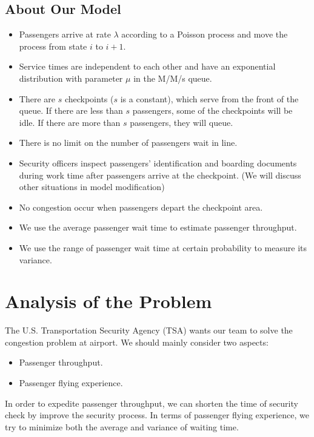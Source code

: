 \documentclass{mcmthesis}
\begin{document}
\subsection{About Our Model}
\begin{itemize}
	\item Passengers arrive at rate $\lambda$ according to a Poisson process and move the process from state $i$ to $i+1$.
	\item Service times are independent to each other and have an exponential distribution with parameter $\mu$ in the M/M/s queue.
	\item There are $s$ checkpoints ($s$ is a constant), which serve from the front of the queue. If there are less than $s$ passengers, some of the checkpoints will be idle. If there are more than $s$ passengers, they will queue.
	\item There is no limit on the number of passengers wait in line.
	\item Security officers inspect passengers' identification and boarding documents during work time after passengers arrive at the checkpoint. (We will discuss other situations in model modification)
	\item No congestion occur when passengers depart the checkpoint area. 
	\item We use the average passenger wait time to estimate passenger throughput. 
	\item We use the range of passenger wait time at certain probability to measure its variance.
\end{itemize}


\section{Analysis of the Problem}

\par The U.S. Transportation Security Agency (TSA) wants our team to solve the congestion problem at airport. We should mainly consider two aspects: 
\begin{itemize}
	\item Passenger throughput.
	\item Passenger flying experience.
\end{itemize}
\par In order to expedite passenger throughput, we can shorten the time of security check by improve the security process. In terms of passenger flying experience, we try to minimize both the average and variance of waiting time. 
\end{document}
